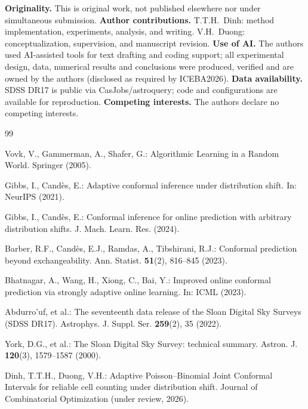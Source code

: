 \documentclass[pdflatex,sn-mathphys-num]{sn-jnl}%
\begin{document}
\backmatter

\textbf{Originality.} This is original work, not published elsewhere nor under simultaneous submission.
\textbf{Author contributions.} T.T.H.~Dinh: method implementation, experiments, analysis, and writing.
V.H.~Duong: conceptualization, supervision, and manuscript revision.
\textbf{Use of AI.} The authors used AI-assisted tools for text drafting and coding support; all
experimental design, data, numerical results and conclusions were produced, verified and are owned by the
authors (disclosed as required by ICEBA2026). \textbf{Data availability.} SDSS DR17 is public via
CasJobs/astroquery; code and configurations are available for reproduction. \textbf{Competing interests.}
The authors declare no competing interests.

\begin{thebibliography}{99}

 Vovk, V., Gammerman, A., Shafer, G.: Algorithmic Learning in a Random World. Springer
(2005).

 Gibbs, I., Cand\`es, E.: Adaptive conformal inference under distribution shift.
In: NeurIPS (2021).

 Gibbs, I., Cand\`es, E.: Conformal inference for online prediction with arbitrary
distribution shifts. J. Mach. Learn. Res. (2024).

 Barber, R.F., Cand\`es, E.J., Ramdas, A., Tibshirani, R.J.: Conformal prediction
beyond exchangeability. Ann. Statist. \textbf{51}(2), 816--845 (2023).

 Bhatnagar, A., Wang, H., Xiong, C., Bai, Y.: Improved online conformal prediction
via strongly adaptive online learning. In: ICML (2023).

 Abdurro'uf, et al.: The seventeenth data release of the Sloan Digital Sky Surveys (SDSS
DR17). Astrophys. J. Suppl. Ser. \textbf{259}(2), 35 (2022).

 York, D.G., et al.: The Sloan Digital Sky Survey: technical summary. Astron. J.
\textbf{120}(3), 1579--1587 (2000).

 Dinh, T.T.H., Duong, V.H.: Adaptive Poisson--Binomial Joint Conformal Intervals for
reliable cell counting under distribution shift. Journal of Combinatorial Optimization (under review, 2026).

\end{thebibliography}
\end{document}
